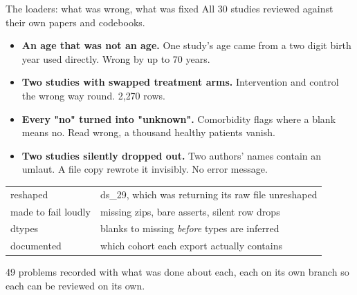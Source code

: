 \documentclass[11pt, t, handout]{beamer}
\newcommand{\ans}[1]{\textcolor{structure.fg}{#1}}
\begin{document}
\begin{frame}{The loaders: what was wrong, what was fixed}
  \pause
  All 30 studies reviewed against their own papers and codebooks.
  \vspace{8pt}
  \pause
  \begin{itemize}\footnotesize
    \setlength{\itemsep}{5pt}
    \item \textbf{An age that was not an age.} One study's age came from a two
          digit birth year used directly. \ans{Wrong by up to 70 years.}
    \pause
    \item \textbf{Two studies with swapped treatment arms.} Intervention and
          control the wrong way round. \ans{2{,}270 rows.}
    \pause
    \item \textbf{Every "no" turned into "unknown".} Comorbidity flags where a
          blank means no. Read wrong, \ans{a thousand healthy patients vanish.}
    \pause
    \item \textbf{Two studies silently dropped out.} Two authors' names contain
          an umlaut. A file copy rewrote it invisibly. \ans{No error message.}
  \end{itemize}
  \vspace{8pt}
  \pause
  \begin{center}\scriptsize
  \begin{tabular}{ll}
    \toprule
    reshaped & ds\_29, which was returning its raw file unreshaped \\
    made to fail loudly & missing zips, bare asserts, silent row drops \\
    dtypes & blanks to missing \emph{before} types are inferred \\
    documented & which cohort each export actually contains \\
    \bottomrule
  \end{tabular}
  \end{center}
  \vspace{6pt}
  \pause
  {\footnotesize 49 problems recorded with what was done about each, each on
   its own branch so each can be reviewed on its own.}
\end{frame}
\end{document}

